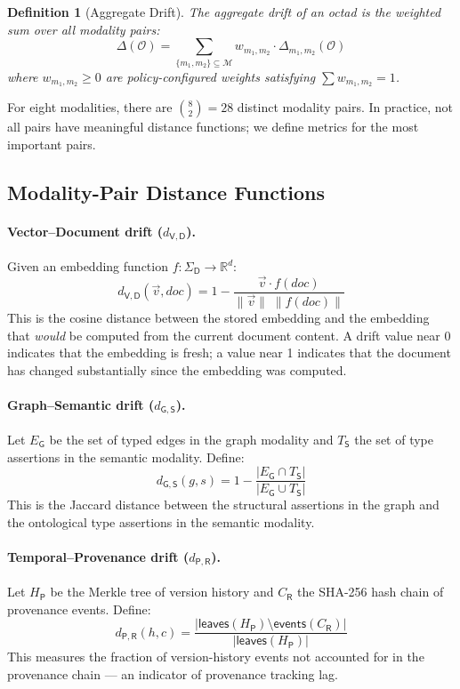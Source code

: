 \documentclass[11pt,twocolumn]{article}
\newtheorem{definition}{Definition}[section]
\newcommand{\octad}{\mathcal{O}}
\newcommand{\modset}{\mathcal{M}}
\newcommand{\driftfn}{\Delta}
\begin{document}
\begin{definition}[Aggregate Drift]\label{def:agg-drift}
The \emph{aggregate drift} of an octad is the weighted sum over all modality
pairs:
\[
  \driftfn(\octad) = \sum_{\{m_1, m_2\} \subseteq \modset}
    w_{m_1, m_2} \cdot \driftfn_{m_1, m_2}(\octad)
\]
where $w_{m_1, m_2} \geq 0$ are policy-configured weights satisfying
$\sum w_{m_1, m_2} = 1$.
\end{definition}

For eight modalities, there are $\binom{8}{2} = 28$ distinct modality pairs.
In practice, not all pairs have meaningful distance functions; we define
metrics for the most important pairs.

\subsection{Modality-Pair Distance Functions}\label{sec:drift-metrics}

\paragraph{Vector--Document drift ($d_{\mathsf{V},\mathsf{D}}$).}
Given an embedding function $f : \Sigma_\mathsf{D} \to \mathbb{R}^d$:
\[
  d_{\mathsf{V},\mathsf{D}}(\vec{v}, \mathit{doc}) =
    1 - \frac{\vec{v} \cdot f(\mathit{doc})}{\|\vec{v}\|\;\|f(\mathit{doc})\|}
\]
This is the cosine distance between the stored embedding and the embedding
that \emph{would} be computed from the current document content.  A drift
value near 0 indicates that the embedding is fresh; a value near 1 indicates
that the document has changed substantially since the embedding was computed.

\paragraph{Graph--Semantic drift ($d_{\mathsf{G},\mathsf{S}}$).}
Let $E_\mathsf{G}$ be the set of typed edges in the graph modality and
$T_\mathsf{S}$ the set of type assertions in the semantic modality.  Define:
\[
  d_{\mathsf{G},\mathsf{S}}(g, s) =
    1 - \frac{|E_\mathsf{G} \cap T_\mathsf{S}|}{|E_\mathsf{G} \cup T_\mathsf{S}|}
\]
This is the Jaccard distance between the structural assertions in the graph
and the ontological type assertions in the semantic modality.

\paragraph{Temporal--Provenance drift ($d_{\mathsf{P},\mathsf{R}}$).}
Let $H_\mathsf{P}$ be the Merkle tree of version history and $C_\mathsf{R}$
the SHA-256 hash chain of provenance events.  Define:
\[
  d_{\mathsf{P},\mathsf{R}}(h, c) =
    \frac{|\mathsf{leaves}(H_\mathsf{P}) \setminus \mathsf{events}(C_\mathsf{R})|}{
      |\mathsf{leaves}(H_\mathsf{P})|}
\]
This measures the fraction of version-history events not accounted for in the
provenance chain --- an indicator of provenance tracking lag.
\end{document}
